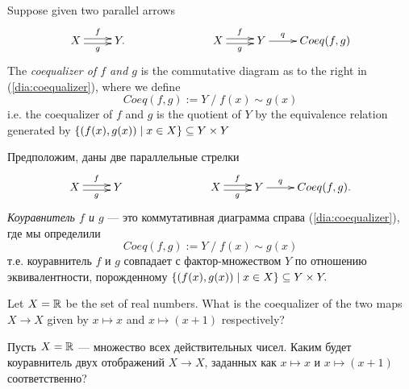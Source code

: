\documentclass[CT4S-EN-RU]{subfiles}
\begin{document}

\subsection{}

\begin{definitionENG}[Coequalizer]\label{def:coequalizer}
Suppose given two parallel arrows 
\begin{align}\label{dia:coequalizer}
\xymatrix{X\ar@<.5ex>[r]^f\ar@<-.5ex>[r]_g&Y.}\hspace{1in}\xymatrix{X\ar@<.5ex>[r]^f\ar@<-.5ex>[r]_g&Y\ar[r]^-q&Coeq(f,g)}
\end{align}
The {\em coequalizer of $f$ and $g$} is the commutative diagram as to the right in (\ref{dia:coequalizer}), where we define $$Coeq(f,g):=Y\;/\;f(x)\sim g(x)$$ i.e. the coequalizer of $f$ and $g$ is the quotient of $Y$ by the equivalence relation generated by $\{(f(x),g(x))\|x\in X\}\ss Y\times Y$
\end{definitionENG}

\begin{definitionRUS}[Коуравнитель]\label{def:coequalizer}
Предположим, даны две параллельные стрелки 
\begin{align}\label{dia:coequalizer}
\xymatrix{X\ar@<.5ex>[r]^f\ar@<-.5ex>[r]_g&Y}\hspace{1in}\xymatrix{X\ar@<.5ex>[r]^f\ar@<-.5ex>[r]_g&Y\ar[r]^-q&Coeq(f,g).}
\end{align}
{\em Коуравнитель $f$ и $g$} — это коммутативная диаграмма справа (\ref{dia:coequalizer}), где мы определили $$Coeq(f,g):=Y\;/\;f(x)\sim g(x)$$ т.е. коуравнитель $f$ и $g$ совпадает с фактор-множеством $Y$ по отношению эквивалентности, порожденному $\{(f(x),g(x))\|x\in X\}\ss Y\times Y.$
\end{definitionRUS}

\begin{exerciseENG}
Let $X=\RR$ be the set of real numbers. What is the coequalizer of the two maps $X\to X$ given by $x\mapsto x$ and $x\mapsto (x+1)$ respectively?
\end{exerciseENG}

\begin{exerciseRUS}
Пусть $X=\RR$ — множество всех действительных чисел. Каким будет коуравнитель двух отображений $X\to X$, заданных как $x\mapsto x$ и $x\mapsto (x+1)$ соответственно?
\end{exerciseRUS}
\end{document}
